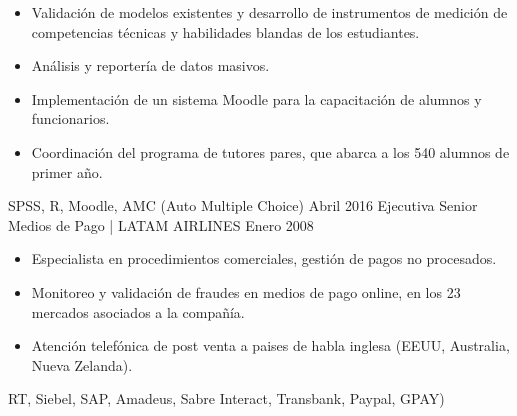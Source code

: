 \begin{experiences}
{\begin{itemize}
                        \item Validación de modelos existentes y desarrollo de instrumentos de medición de competencias técnicas y habilidades blandas de los estudiantes.
                        \item Análisis y reportería de datos masivos.
                        \item Implementación de un sistema Moodle para la capacitación de alumnos y funcionarios.
                        \item Coordinación del programa de tutores pares, que abarca a los 540 alumnos de primer año.
                      \end{itemize}
                    }
                    {SPSS, R, Moodle, AMC (Auto Multiple Choice)}
  \emptySeparator
  \experience
    {Abril 2016}     {Ejecutiva Senior Medios de Pago | LATAM AIRLINES}{}{}
    {Enero 2008}    {
                      \begin{itemize}
                        \item Especialista en procedimientos comerciales, gestión de pagos no procesados.
                        \item Monitoreo y validación de fraudes en medios de pago online, en los 23 mercados asociados a la compañía.
                        \item Atención telefónica de post venta a paises de habla inglesa (EEUU, Australia, Nueva Zelanda). 
                      \end{itemize}
                    }
                    {RT, Siebel, SAP, Amadeus, Sabre Interact, Transbank, Paypal, GPAY)}
  \emptySeparator  
\end{experiences}
